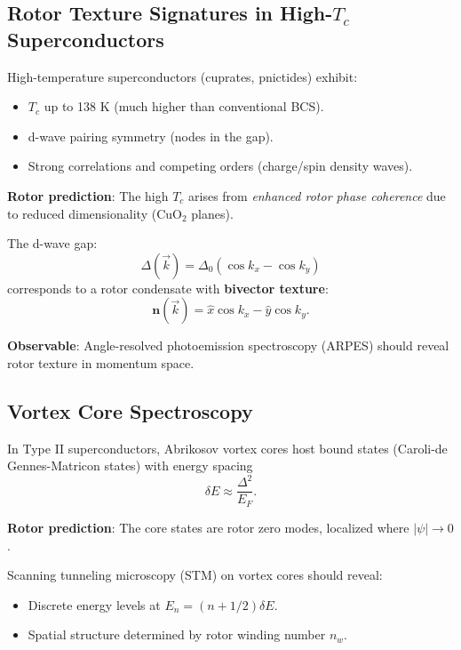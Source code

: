 \documentclass[12pt,a4paper]{article}
\theoremstyle{definition}
\theoremstyle{remark}
\begin{document}
\subsection{Rotor Texture Signatures in High-$T_c$ Superconductors}

High-temperature superconductors (cuprates, pnictides) exhibit:
\begin{itemize}
\item $T_c$ up to 138 K (much higher than conventional BCS).
\item d-wave pairing symmetry (nodes in the gap).
\item Strong correlations and competing orders (charge/spin density waves).
\end{itemize}

\textbf{Rotor prediction}: The high $T_c$ arises from \emph{enhanced rotor phase coherence} due to reduced dimensionality (CuO$_2$ planes).

The d-wave gap:
\begin{equation}
\Delta(\vec{k}) = \Delta_0 (\cos k_x - \cos k_y)
\end{equation}
corresponds to a rotor condensate with \textbf{bivector texture}:
\begin{equation}
\mathbf{n}(\vec{k}) = \hat{x} \cos k_x - \hat{y} \cos k_y.
\end{equation}

\textbf{Observable}: Angle-resolved photoemission spectroscopy (ARPES) should reveal rotor texture in momentum space.

\subsection{Vortex Core Spectroscopy}

In Type II superconductors, Abrikosov vortex cores host bound states (Caroli-de Gennes-Matricon states) with energy spacing
\begin{equation}
\delta E \approx \frac{\Delta^2}{E_F}.
\end{equation}

\textbf{Rotor prediction}: The core states are rotor zero modes, localized where $|\psi| \to 0$.

Scanning tunneling microscopy (STM) on vortex cores should reveal:
\begin{itemize}
\item Discrete energy levels at $E_n = (n + 1/2) \delta E$.
\item Spatial structure determined by rotor winding number $n_w$.
\end{itemize}
\end{document}
